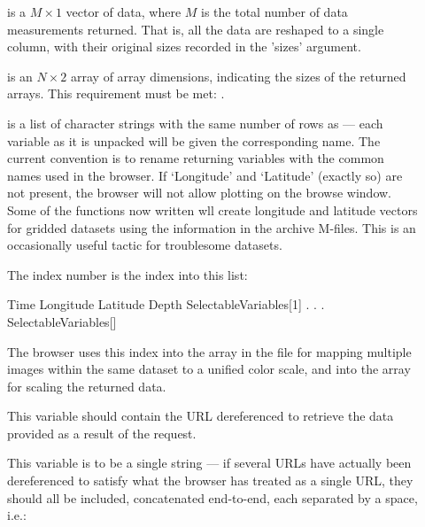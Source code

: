 \begin{description}
  
\item[] is a $M\times1$ vector of data, where $M$ is the
  total number of data measurements returned.  That is, all the data
  are reshaped to a single column, with their original sizes recorded
  in the 'sizes' argument.
  
\item[] is an $N\times2$ array of array dimensions,
  indicating the sizes of the returned arrays.  This requirement must
  be met: .
  
\item[] is a list of character strings with the same number
  of rows as  --- each variable as it is unpacked will be
  given the corresponding name.  The current convention is to rename
  returning variables with the common names used in the browser.  If
  `Longitude' and `Latitude' (exactly so) are not present, the browser
  will not allow plotting on the browse window.  Some of the
   functions now written wll create longitude and latitude
  vectors for gridded datasets using the information in the archive
  M-files.  This is an occasionally useful tactic for troublesome
  datasets. 
  

\item[] The index number is the
index into this list:

\begin{example}
Time
Longitude
Latitude
Depth
SelectableVariables[1]
.
.
.
SelectableVariables[]
\end{example}

  The browser uses this index into the  array in the
   file for mapping multiple images within the
  same dataset to a unified color scale, and into the 
  array for scaling the returned data.

\item[] This variable should contain the URL dereferenced to
  retrieve the data provided as a result of the  request.

  This variable is to be a single string --- if several
  URLs have actually been dereferenced to satisfy what the browser has
  treated as a single URL, they should all be included, concatenated
  end-to-end, each separated by a space, i.e.:

\end{description}
                
